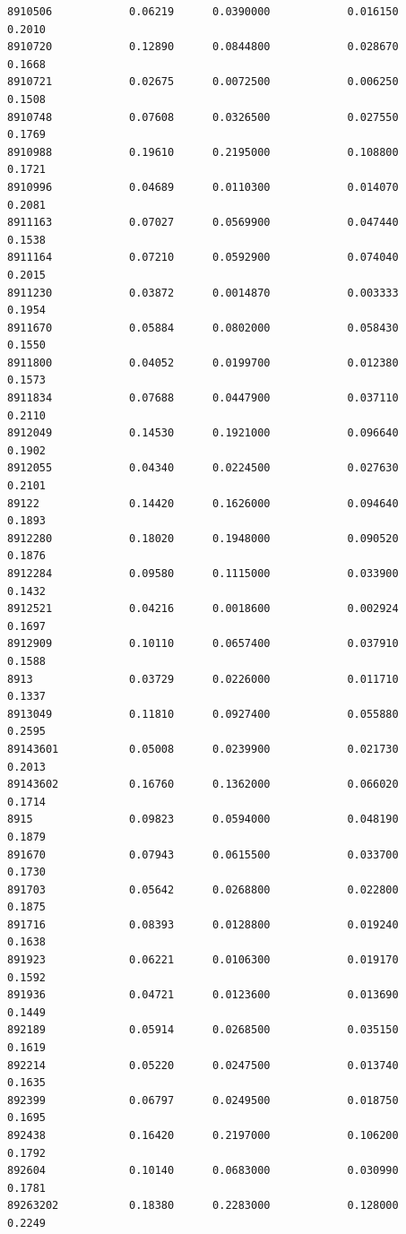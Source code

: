 \documentclass[
  letterpaper,
  DIV=11,
  numbers=noendperiod]{scrartcl}
\begin{document}
\begin{verbatim}
8910506            0.06219      0.0390000            0.016150        0.2010
8910720            0.12890      0.0844800            0.028670        0.1668
8910721            0.02675      0.0072500            0.006250        0.1508
8910748            0.07608      0.0326500            0.027550        0.1769
8910988            0.19610      0.2195000            0.108800        0.1721
8910996            0.04689      0.0110300            0.014070        0.2081
8911163            0.07027      0.0569900            0.047440        0.1538
8911164            0.07210      0.0592900            0.074040        0.2015
8911230            0.03872      0.0014870            0.003333        0.1954
8911670            0.05884      0.0802000            0.058430        0.1550
8911800            0.04052      0.0199700            0.012380        0.1573
8911834            0.07688      0.0447900            0.037110        0.2110
8912049            0.14530      0.1921000            0.096640        0.1902
8912055            0.04340      0.0224500            0.027630        0.2101
89122              0.14420      0.1626000            0.094640        0.1893
8912280            0.18020      0.1948000            0.090520        0.1876
8912284            0.09580      0.1115000            0.033900        0.1432
8912521            0.04216      0.0018600            0.002924        0.1697
8912909            0.10110      0.0657400            0.037910        0.1588
8913               0.03729      0.0226000            0.011710        0.1337
8913049            0.11810      0.0927400            0.055880        0.2595
89143601           0.05008      0.0239900            0.021730        0.2013
89143602           0.16760      0.1362000            0.066020        0.1714
8915               0.09823      0.0594000            0.048190        0.1879
891670             0.07943      0.0615500            0.033700        0.1730
891703             0.05642      0.0268800            0.022800        0.1875
891716             0.08393      0.0128800            0.019240        0.1638
891923             0.06221      0.0106300            0.019170        0.1592
891936             0.04721      0.0123600            0.013690        0.1449
892189             0.05914      0.0268500            0.035150        0.1619
892214             0.05220      0.0247500            0.013740        0.1635
892399             0.06797      0.0249500            0.018750        0.1695
892438             0.16420      0.2197000            0.106200        0.1792
892604             0.10140      0.0683000            0.030990        0.1781
89263202           0.18380      0.2283000            0.128000        0.2249

\end{verbatim}
\end{document}
